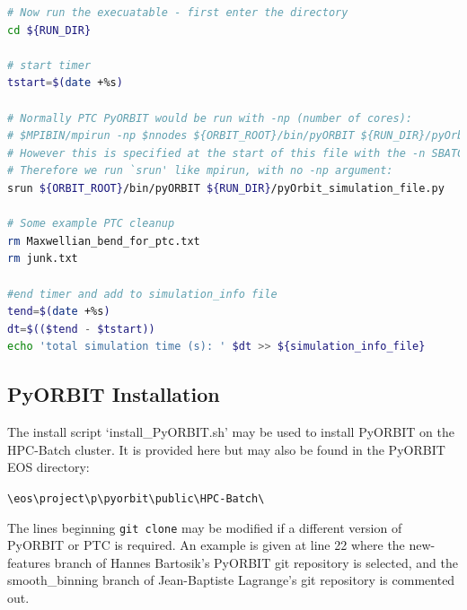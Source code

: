 \documentclass[a4paper]{cernatsnote}
\def \pyorbiteos {\texttt{\textbackslash eos\textbackslash project\textbackslash p\textbackslash pyorbit\textbackslash public\textbackslash HPC-Batch\textbackslash}}
\begin{document}
\begin{lstlisting}[language=bash, belowskip=-3\medskipamount]
# Now run the execuatable - first enter the directory
cd ${RUN_DIR}

# start timer
tstart=$(date +%s)

# Normally PTC PyORBIT would be run with -np (number of cores):
# $MPIBIN/mpirun -np $nnodes ${ORBIT_ROOT}/bin/pyORBIT ${RUN_DIR}/pyOrbit.py
# However this is specified at the start of this file with the -n SBATCH command
# Therefore we run `srun' like mpirun, with no -np argument:
srun ${ORBIT_ROOT}/bin/pyORBIT ${RUN_DIR}/pyOrbit_simulation_file.py

# Some example PTC cleanup
rm Maxwellian_bend_for_ptc.txt
rm junk.txt

#end timer and add to simulation_info file
tend=$(date +%s)
dt=$(($tend - $tstart))
echo 'total simulation time (s): ' $dt >> ${simulation_info_file}
\end{lstlisting}
	
	
	
\subsection{PyORBIT Installation}
\label{sec:install_script}

The install script `install\_PyORBIT.sh' may be used to install PyORBIT on the HPC-Batch cluster. It is provided here but may also be found in the PyORBIT EOS directory:

\pyorbiteos

The lines beginning \texttt{git clone} may be modified if a different version of PyORBIT or PTC is required. An example is given at line 22 where the new-features branch of Hannes Bartosik's PyORBIT git repository is selected, and the smooth\_binning branch of Jean-Baptiste Lagrange's git repository is commented out.
	
\end{document}
